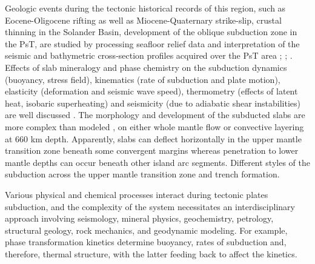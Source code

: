 \documentclass[11pt,a4paper]{report}
\begin{document}
{Geologic events during the tectonic historical records of this region, such as Eocene-Oligocene rifting as well as Miocene-Quaternary strike-slip, crustal thinning in the Solander Basin, development of the oblique subduction zone in the \ac{PsT}, are studied by processing seafloor relief data and interpretation of the seismic and bathymetric cross-section profiles acquired over the \ac{PsT} area \cite{Melhuish1999}; \cite{Lamarche1997}; \cite{Lamarche2000}. Effects of slab mineralogy and phase chemistry on the subduction dynamics (buoyancy, stress field), kinematics (rate of subduction and plate motion), elasticity (deformation and seismic wave speed), thermometry (effects of latent heat, isobaric superheating) and seismicity (due to adiabatic shear instabilities) are well discussed \cite{Binaetal2001}. The morphology and development of the subducted slabs are more complex than modeled \cite{Christensen1996}, on either whole mantle flow or convective layering at 660 km depth. Apparently, slabs can deflect horizontally in the upper mantle transition zone beneath some convergent margins whereas penetration to lower mantle depths can occur beneath other island arc segments. Different styles of the subduction across the upper mantle transition zone and trench formation.

Various physical and chemical processes interact during tectonic plates subduction, and the complexity of the system necessitates an interdisciplinary approach involving seismology, mineral physics, geochemistry, petrology, structural geology, rock mechanics, and geodynamic modeling. For example, phase transformation kinetics determine buoyancy, rates of subduction and, therefore, thermal structure, with the latter feeding back to affect the kinetics. 

}
\end{document}
